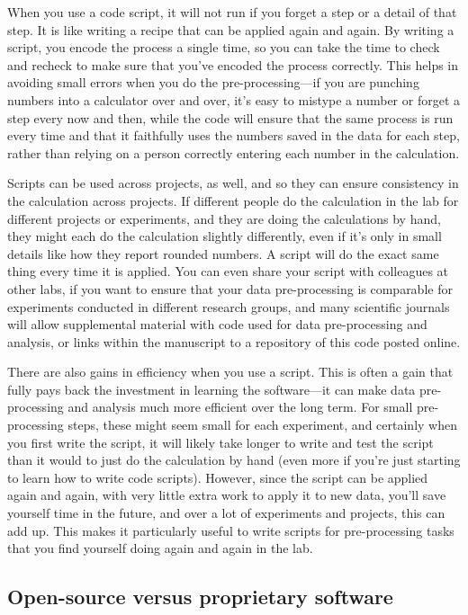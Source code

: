 \documentclass[]{tufte-book}
\begin{document}
When you use a code script, it will not run if you forget a step or a detail of
that step. It is like writing a recipe that can be applied again and again. By
writing a script, you encode the process a single time, so you can take the time
to check and recheck to make sure that you've encoded the process correctly.
This helps in avoiding small errors when you do the pre-processing---if you are
punching numbers into a calculator over and over, it's easy to mistype a number
or forget a step every now and then, while the code will ensure that the same
process is run every time and that it faithfully uses the numbers saved in the
data for each step, rather than relying on a person correctly entering each
number in the calculation.

Scripts can be used across projects, as well, and so they can ensure consistency
in the calculation across projects. If different people do the calculation in
the lab for different projects or experiments, and they are doing the
calculations by hand, they might each do the calculation slightly differently,
even if it's only in small details like how they report rounded numbers. A
script will do the exact same thing every time it is applied. You can even share
your script with colleagues at other labs, if you want to ensure that your data
pre-processing is comparable for experiments conducted in different research
groups, and many scientific journals will allow supplemental material with
code used for data pre-processing and analysis, or links within the manuscript
to a repository of this code posted online.

There are also gains in efficiency when you use a script. This is often a gain
that fully pays back the investment in learning the software---it can make data
pre-processing and analysis much more efficient over the long term. For small
pre-processing steps, these might seem small for each experiment, and certainly
when you first write the script, it will likely take longer to write and test
the script than it would to just do the calculation by hand (even more if you're
just starting to learn how to write code scripts). However, since the script can
be applied again and again, with very little extra work to apply it to new data,
you'll save yourself time in the future, and over a lot of experiments and
projects, this can add up. This makes it particularly useful to write scripts
for pre-processing tasks that you find yourself doing again and again in the
lab.

\subsection{Open-source versus proprietary software}\label{open-source-versus-proprietary-software}
\end{document}
